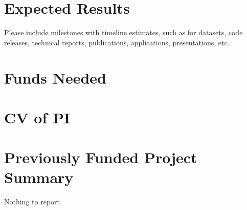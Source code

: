 \documentclass[11pt,onecolumn,notitlepage]{article}
\begin{document}
\section*{Expected Results}
Please include milestones with timeline estimates, such as for datasets, code releases, technical reports, publications, applications, presentations, etc. 

\section*{Funds Needed}

\appendix
\appendixpage




\section{CV of PI}

\section{Previously Funded Project Summary}
Nothing to report.
\end{document}
